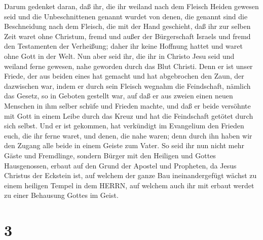  Darum gedenket daran, daß ihr, die ihr weiland nach dem
Fleisch Heiden gewesen seid und die Unbeschnittenen genannt wurdet von
denen, die genannt sind die Beschneidung nach dem Fleisch, die mit der
Hand geschieht,  daß ihr zur selben Zeit waret ohne
Christum, fremd und außer der Bürgerschaft Israels und fremd den
Testamenten der Verheißung; daher ihr keine Hoffnung hattet und waret
ohne Gott in der Welt.  Nun aber seid ihr, die ihr in
Christo Jesu seid und weiland ferne gewesen, nahe geworden durch das
Blut Christi.  Denn er ist unser Friede, der aus beiden
eines hat gemacht und hat abgebrochen den Zaun, der dazwischen war,
indem er durch sein Fleisch wegnahm die Feindschaft, 
nämlich das Gesetz, so in Geboten gestellt war, auf daß er aus zweien
einen neuen Menschen in ihm selber schüfe und Frieden machte,
 und daß er beide versöhnte mit Gott in einem Leibe durch
das Kreuz und hat die Feindschaft getötet durch sich selbst.
 Und er ist gekommen, hat verkündigt im Evangelium den
Frieden euch, die ihr ferne waret, und denen, die nahe waren;
 denn durch ihn haben wir den Zugang alle beide in einem
Geiste zum Vater.  So seid ihr nun nicht mehr Gäste und
Fremdlinge, sondern Bürger mit den Heiligen und Gottes Hausgenossen,
 erbaut auf den Grund der Apostel und Propheten, da Jesus
Christus der Eckstein ist,  auf welchem der ganze Bau
ineinandergefügt wächst zu einem heiligen Tempel in dem HERRN,
 auf welchem auch ihr mit erbaut werdet zu einer Behausung
Gottes im Geist.

\hypertarget{section-2}{%
\section{3}\label{section-2}}

